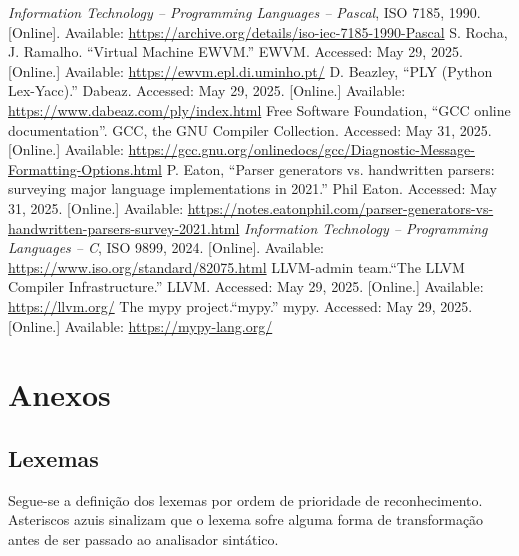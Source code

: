 \documentclass[12pt, a4paper]{article}
\begin{document}
\begin{thebibliography}{9}
        \emph{Information Technology -- Programming Languages -- Pascal}, ISO 7185, 1990. [Online].
        Available: \url{https://archive.org/details/iso-iec-7185-1990-Pascal}
        S. Rocha, J. Ramalho. ``Virtual Machine EWVM.'' EWVM. Accessed: May 29, 2025. [Online.]
        Available: \url{https://ewvm.epl.di.uminho.pt/}
        D. Beazley, ``PLY (Python Lex-Yacc).'' Dabeaz. Accessed: May 29, 2025. [Online.] Available:
        \url{https://www.dabeaz.com/ply/index.html}
        Free Software Foundation, ``GCC online documentation''. GCC, the GNU Compiler Collection.
        Accessed: May 31, 2025. [Online.] Available:
        \url{https://gcc.gnu.org/onlinedocs/gcc/Diagnostic-Message-Formatting-Options.html}
        P. Eaton, ``Parser generators vs. handwritten parsers: surveying major language
        implementations in 2021.'' Phil Eaton. Accessed: May 31, 2025. [Online.] Available:
        \url{https://notes.eatonphil.com/parser-generators-vs-handwritten-parsers-survey-2021.html}
        \emph{Information Technology -- Programming Languages -- C}, ISO 9899, 2024. [Online].
        Available: \url{https://www.iso.org/standard/82075.html}
        LLVM-admin team.``The LLVM Compiler Infrastructure.'' LLVM. Accessed: May 29, 2025.
        [Online.] Available: \url{https://llvm.org/}
        The mypy project.``mypy.'' mypy. Accessed: May 29, 2025. [Online.] Available:
        \url{https://mypy-lang.org/}
\end{thebibliography}
\endgroup

\section{Anexos}

\subsection{Lexemas}
\label{lexer-definition}

Segue-se a definição dos lexemas por ordem de prioridade de reconhecimento. Asteriscos azuis
sinalizam que o lexema sofre alguma forma de transformação antes de ser passado ao analisador
sintático.

\end{document}
